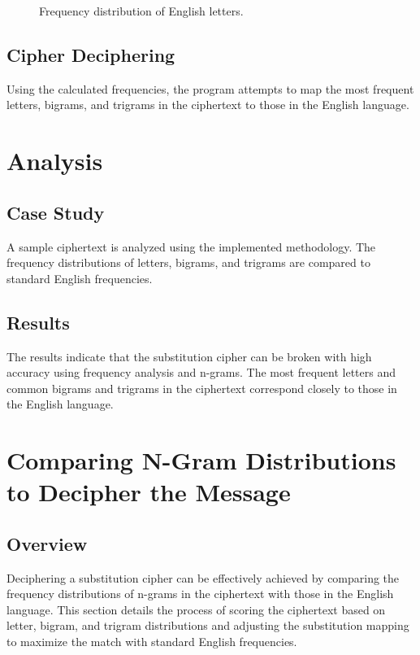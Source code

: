 \documentclass[12pt]{article}
\begin{document}
\begin{figure}[h!]
	\centering
	\caption{Frequency distribution of English letters.}
\end{figure}

\newpage

\subsection{Cipher Deciphering}
Using the calculated frequencies, the program attempts to map the most frequent letters, bigrams, and trigrams in the ciphertext to those in the English language.

\section{Analysis}
\subsection{Case Study}
A sample ciphertext is analyzed using the implemented methodology. The frequency distributions of letters, bigrams, and trigrams are compared to standard English frequencies.

\subsection{Results}
The results indicate that the substitution cipher can be broken with high accuracy using frequency analysis and n-grams. The most frequent letters and common bigrams and trigrams in the ciphertext correspond closely to those in the English language.

\section{Comparing N-Gram Distributions to Decipher the Message}
\subsection{Overview}
Deciphering a substitution cipher can be effectively achieved by comparing the frequency distributions of n-grams in the ciphertext with those in the English language. This section details the process of scoring the ciphertext based on letter, bigram, and trigram distributions and adjusting the substitution mapping to maximize the match with standard English frequencies.
\end{document}
